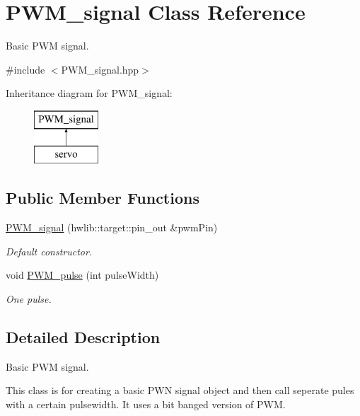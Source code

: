 \hypertarget{class_p_w_m__signal}{}\section{P\+W\+M\+\_\+signal Class Reference}
\label{class_p_w_m__signal}


Basic P\+WM signal.  




{\ttfamily \#include $<$P\+W\+M\+\_\+signal.\+hpp$>$}

Inheritance diagram for P\+W\+M\+\_\+signal\+:\begin{figure}[H]
\begin{center}
\leavevmode
\includegraphics[height=2.000000cm]{class_p_w_m__signal}
\end{center}
\end{figure}
\subsection*{Public Member Functions}
\begin{DoxyCompactItemize}
\item 
\hyperlink{class_p_w_m__signal_ad64aad0e6fe9cf246715bc9cf0f78247}{P\+W\+M\+\_\+signal} (hwlib\+::target\+::pin\+\_\+out \&pwm\+Pin)
\begin{DoxyCompactList}\small\item\em Default constructor. \end{DoxyCompactList}\item 
void \hyperlink{class_p_w_m__signal_a82a9e4648b24a15992b59918e640157c}{P\+W\+M\+\_\+pulse} (int pulse\+Width)
\begin{DoxyCompactList}\small\item\em One pulse. \end{DoxyCompactList}\end{DoxyCompactItemize}


\subsection{Detailed Description}
Basic P\+WM signal. 

This class is for creating a basic P\+WN signal object and then call seperate pules with a certain pulsewidth. It uses a bit banged version of P\+WM. 

